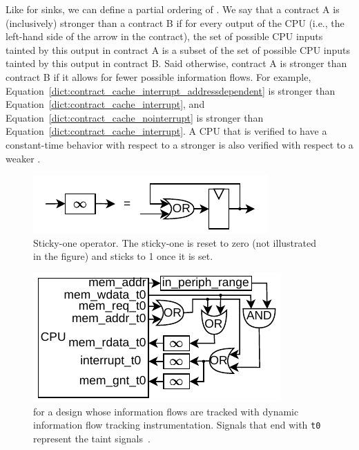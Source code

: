 
Like for sinks, we can define a partial ordering of \pics.
We say that a contract A is (inclusively) stronger than a contract B if for every output of the CPU (i.e., the left-hand side of the arrow in the contract), the set of possible CPU inputs tainted by this output in contract A is a subset of the set of possible CPU inputs tainted by this output in contract B.
Said otherwise, contract A is stronger than contract B if it allows for fewer possible information flows.
For example, Equation~\ref{dict:contract_cache_interrupt_addressdependent} is stronger than Equation~\ref{dict:contract_cache_interrupt}, and Equation~\ref{dict:contract_cache_nointerrupt} is stronger than Equation~\ref{dict:contract_cache_interrupt}.
A CPU that is verified to have a constant-time behavior with respect to a stronger \pic is also verified with respect to a weaker \pic.

\begin{figure}
    \begin{center}
    \includegraphics[width=.7\columnwidth]{figures/stickyone/stickyone.pdf}
    \end{center}
    \vspace*{-1em}
    \caption{Sticky-one operator. The sticky-one is reset to zero (not illustrated in the figure) and sticks to 1 once it is set.}
    \label{fig:stickyone}
    \vspace*{-.4em}
\end{figure}


\begin{figure}[t]
    \begin{center}
    \includegraphics[width=.7\columnwidth]{figures/picinstrum_taints/picinstrum_taints.pdf}
    \end{center}
    \vspace*{-1em}
    \caption{\Pici for a design whose information flows are tracked with dynamic information flow tracking instrumentation. Signals that end with \texttt{t0} represent the taint signals~\cite{tiwari2009complete,solt2022cellift}.
    }
    \label{fig:pic_instrum_taints}
    \vspace*{-.4em}
\end{figure}


